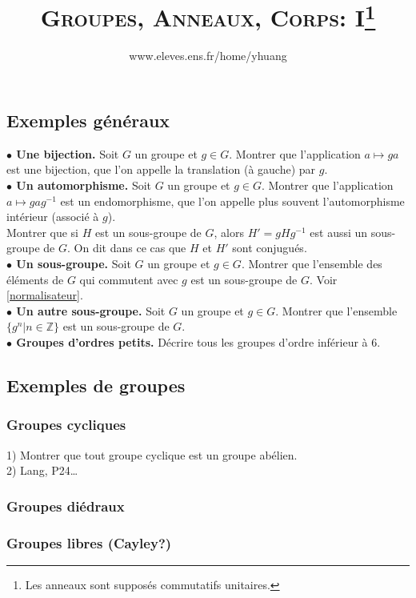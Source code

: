 \documentclass{article}
\begin{document}
\setcounter{section}{12}

\title{\textsc{Groupes, Anneaux, Corps: I}\protect\footnote{Les anneaux sont suppos\'es commutatifs unitaires.}}
\author{www.eleves.ens.fr/home/yhuang}
\date{}
\maketitle

\subsection{Exemples g\'en\'eraux}
\textbf{$\bullet$ Une bijection.}
Soit $G$ un groupe et $g\in G$. Montrer que l'application $a\mapsto ga$ est une bijection, que l'on appelle la translation (\`a gauche) par $g$.\\
\textbf{$\bullet$ Un automorphisme.}
Soit $G$ un groupe et $g\in G$. Montrer que l'application $a\mapsto gag^{-1}$ est un endomorphisme, que l'on appelle plus souvent l'automorphisme int\'erieur (associ\'e \`a $g$).\\
Montrer que si $H$ est un sous-groupe de $G$, alors $H'=gHg^{-1}$ est aussi un sous-groupe de $G$. On dit dans ce cas que $H$ et $H'$ sont conjugu\'es.\\
\textbf{$\bullet$ Un sous-groupe.}
Soit $G$ un groupe et $g\in G$. Montrer que l'ensemble des \'el\'ements de $G$ qui commutent avec $g$ est un sous-groupe de $G$. Voir \ref{normalisateur}.\\
\textbf{$\bullet$ Un autre sous-groupe.}
Soit $G$ un groupe et $g\in G$. Montrer que l'ensemble $\{g^n|n\in\mathbb{Z}\}$ est un sous-groupe de $G$.\\
\textbf{$\bullet$ Groupes d'ordres petits.}
D\'ecrire tous les groupes d'ordre inf\'erieur \`a $6$.


\subsection{Exemples de groupes}
\subsubsection{Groupes cycliques}
1) Montrer que tout groupe cyclique est un groupe ab\'elien.\\
2) Lang, P24\dots
\subsubsection{Groupes di\'edraux}
\subsubsection{Groupes libres (Cayley?)}
\end{document}
